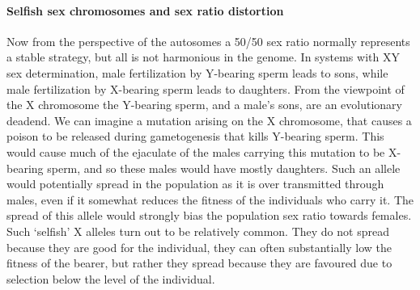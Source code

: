 {\paragraph{Selfish sex chromosomes and sex ratio distortion}
Now from the perspective of the autosomes a 50/50 sex ratio normally represents
a stable strategy, but all is not harmonious in the genome. In
systems with XY sex determination, male fertilization by Y-bearing sperm
leads to sons, while male fertilization by X-bearing sperm leads to daughters. 
From the viewpoint of the X chromosome the Y-bearing sperm, and a
male's sons, are an evolutionary deadend. We can imagine a mutation
arising on the X chromosome, that causes a poison to be released
during gametogenesis that kills Y-bearing sperm. This would cause much
of the ejaculate of the males carrying this mutation to be X-bearing sperm, and so these males would have mostly
daughters. Such an allele would potentially spread in the population
as it is over transmitted through males, even if it somewhat reduces
the fitness of the individuals who carry it. The spread of this allele would strongly
bias the population sex ratio towards females. Such `selfish' X alleles turn out to be relatively common. They do not
spread because they are good for the individual, they can often
substantially low the fitness of the bearer, but rather they spread because
they are favoured due to selection below the level of the individual.

}
